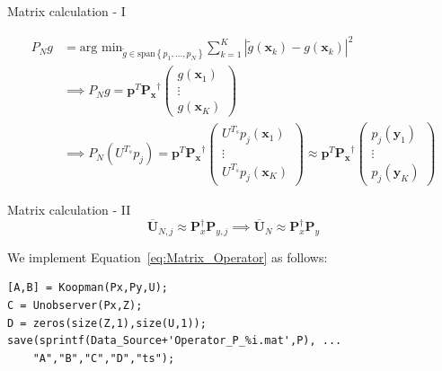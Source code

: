 \documentclass{beamer}
\begin{document}
\begin{frame}{Matrix calculation - I}

    \begin{align}
        P_N g &= \text{arg min}_{\tilde{g} \in \text{span}\left\{p_1 , \dots , p_N\right\}} \sum_{k=1}^K \left|\tilde{g}\left(\mathbf{x}_k\right) - g\left(\mathbf{x}_k\right)\right|^2 \\
        &\implies P_N g = \mathbf{p}^T \mathbf{P_x}^\dagger
        \begin{pmatrix}
            g\left(\mathbf{x}_1\right) \\
            \vdots \\
            g\left(\mathbf{x}_K\right)
        \end{pmatrix} \\
        & \implies P_N \left(U^{T_s} p_j\right) = \mathbf{p}^T \mathbf{P_x}^\dagger
        \begin{pmatrix}
            U^{T_s} p_j\left(\mathbf{x}_1\right) \\
            \vdots \\
            U^{T_s} p_j\left(\mathbf{x}_K\right)
        \end{pmatrix}
        \approx \mathbf{p}^T \mathbf{P_x}^\dagger
        \begin{pmatrix}
            p_j\left(\mathbf{y}_1\right) \\
            \vdots \\
            p_j\left(\mathbf{y}_K\right)
        \end{pmatrix}
    \end{align}
\end{frame}

\begin{frame}[fragile]{Matrix calculation - II}
    \begin{equation} \label{eq:Matrix_Operator}
        \overline{\mathbf{U}}_{N,j} \approx \mathbf{P}_x^\dagger \mathbf{P}_{y,j} \implies \overline{\mathbf{U}}_N \approx \mathbf{P}_x^\dagger \mathbf{P}_y
    \end{equation}
    
    We implement Equation~\ref{eq:Matrix_Operator} as follows:

    \begin{lstlisting}
[A,B] = Koopman(Px,Py,U);
C = Unobserver(Px,Z);
D = zeros(size(Z,1),size(U,1));
save(sprintf(Data_Source+'Operator_P_%i.mat',P), ...
    "A","B","C","D","ts");
    \end{lstlisting}
\end{frame}
\end{document}
